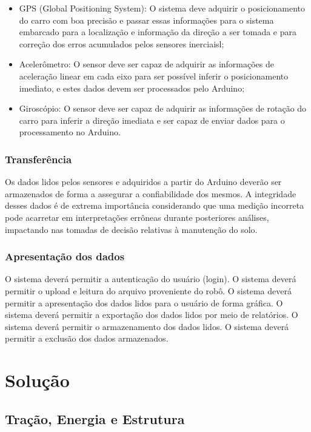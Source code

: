 \begin{itemize}
	\item GPS (Global Positioning System): O sistema deve adquirir o posicionamento do carro com boa precisão e passar essas informações para o sistema embarcado para a localização e informação da direção a ser tomada e para correção dos erros acumulados pelos sensores inerciaisl;
	\item Acelerômetro: O sensor deve ser capaz de adquirir as informações de aceleração linear em cada eixo para ser possível inferir o posicionamento imediato, e estes dados devem ser processados pelo Arduino;
	\item Giroscópio: O sensor deve ser capaz de adquirir as informações de rotação do carro para inferir a direção imediata e ser capaz de enviar dados para o processamento no Arduino.
\end{itemize}

\subsection{Transferência}

Os dados lidos pelos sensores e adquiridos a partir do Arduino deverão ser armazenados de forma a assegurar a confiabilidade dos mesmos. A integridade desses dados é de extrema importância considerando que uma medição incorreta pode acarretar em interpretações errôneas durante posteriores análises, impactando nas tomadas de decisão relativas à manutenção do solo.

\subsection{Apresentação dos dados}

O sistema deverá permitir a autenticação do usuário (login).
O sistema deverá permitir o upload e leitura do arquivo proveniente do robô.
O sistema deverá permitir a apresentação dos dados lidos para o usuário de forma gráfica.
O sistema deverá permitir a exportação dos dados lidos por meio de relatórios.
O sistema deverá permitir o armazenamento dos dados lidos.
O sistema deverá permitir a exclusão dos dados armazenados.

\chapter[Solução]{Solução}

\section{Tração, Energia e Estrutura}

